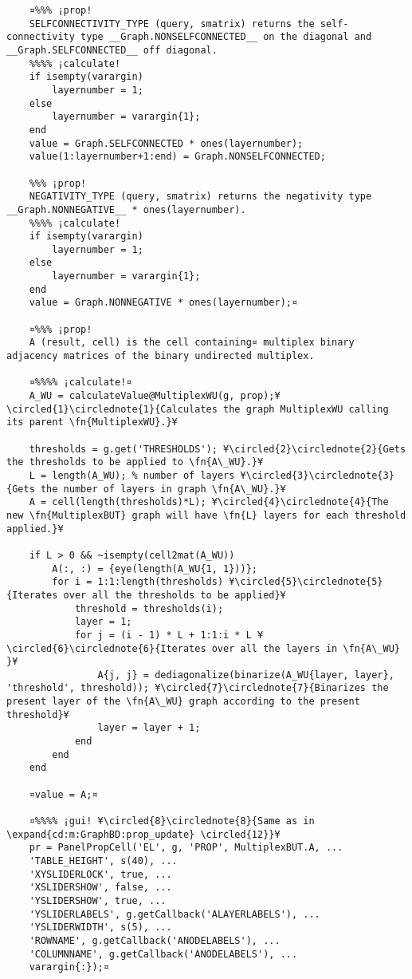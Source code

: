\documentclass{tufte-handout}
\begin{document}
\begin{lstlisting}
	¤%%% ¡prop!
	SELFCONNECTIVITY_TYPE (query, smatrix) returns the self-connectivity type __Graph.NONSELFCONNECTED__ on the diagonal and __Graph.SELFCONNECTED__ off diagonal.
	%%%% ¡calculate!
	if isempty(varargin)
		layernumber = 1;
	else
		layernumber = varargin{1};
	end
	value = Graph.SELFCONNECTED * ones(layernumber);
	value(1:layernumber+1:end) = Graph.NONSELFCONNECTED;                
	
	%%% ¡prop!
	NEGATIVITY_TYPE (query, smatrix) returns the negativity type __Graph.NONNEGATIVE__ * ones(layernumber).
	%%%% ¡calculate!
	if isempty(varargin)
		layernumber = 1;
	else
		layernumber = varargin{1};
	end
	value = Graph.NONNEGATIVE * ones(layernumber);¤
	
	¤%%% ¡prop!
	A (result, cell) is the cell containing¤ multiplex binary adjacency matrices of the binary undirected multiplex.
	
	¤%%%% ¡calculate!¤
	A_WU = calculateValue@MultiplexWU(g, prop);¥\circled{1}\circlednote{1}{Calculates the graph MultiplexWU calling its parent \fn{MultiplexWU}.}¥
	
	thresholds = g.get('THRESHOLDS'); ¥\circled{2}\circlednote{2}{Gets the thresholds to be applied to \fn{A\_WU}.}¥
	L = length(A_WU); % number of layers ¥\circled{3}\circlednote{3}{Gets the number of layers in graph \fn{A\_WU}.}¥
	A = cell(length(thresholds)*L); ¥\circled{4}\circlednote{4}{The new \fn{MultiplexBUT} graph will have \fn{L} layers for each threshold applied.}¥
	
	if L > 0 && ~isempty(cell2mat(A_WU))
		A(:, :) = {eye(length(A_WU{1, 1}))};
		for i = 1:1:length(thresholds) ¥\circled{5}\circlednote{5}{Iterates over all the thresholds to be applied}¥
			threshold = thresholds(i);
			layer = 1;
			for j = (i - 1) * L + 1:1:i * L ¥\circled{6}\circlednote{6}{Iterates over all the layers in \fn{A\_WU} }¥
				A{j, j} = dediagonalize(binarize(A_WU{layer, layer}, 'threshold', threshold)); ¥\circled{7}\circlednote{7}{Binarizes the present layer of the \fn{A\_WU} graph according to the present threshold}¥
				layer = layer + 1;
			end
		end
	end
	
	¤value = A;¤
	
	¤%%%% ¡gui! ¥\circled{8}\circlednote{8}{Same as in \expand{cd:m:GraphBD:prop_update} \circled{12}}¥
	pr = PanelPropCell('EL', g, 'PROP', MultiplexBUT.A, ...
	'TABLE_HEIGHT', s(40), ...
	'XYSLIDERLOCK', true, ... 
	'XSLIDERSHOW', false, ...
	'YSLIDERSHOW', true, ...
	'YSLIDERLABELS', g.getCallback('ALAYERLABELS'), ...
	'YSLIDERWIDTH', s(5), ...
	'ROWNAME', g.getCallback('ANODELABELS'), ...
	'COLUMNNAME', g.getCallback('ANODELABELS'), ...
	varargin{:});¤
	

\end{lstlisting}
\end{document}
